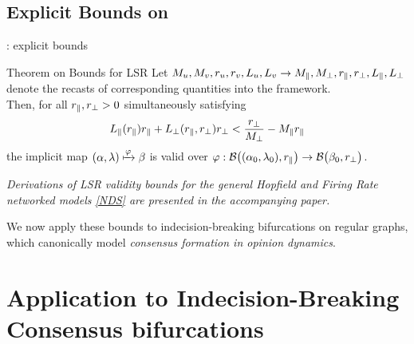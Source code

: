 \documentclass[11pt]{beamer}
\begin{document}
\subsection{Explicit Bounds on \LSR{}}

\begin{frame}{\LSR{}: explicit bounds}

    \setlength{\abovedisplayskip}{3pt}
    \setlength{\belowdisplayskip}{3pt}
    \setlength{\jot}{1pt}

    \begin{block}{Theorem on Bounds for LSR \cite{gupta2024estimates}}
        Let \(M_u, M_v, r_u, r_v, L_u, L_v \to M_{\parallel}, M_{\perp}, r_{\parallel}, r_{\perp}, L_{\parallel}, L_{\perp}\) denote the recasts of corresponding quantities into the \LSR{} framework. \\[3mm]
        Then, for all \(r_{\parallel},r_{\perp} > 0\) simultaneously satisfying
        \begin{equation*}
            L_{\parallel}(r_{\parallel}) r_{\parallel} + L_{\perp}(r_{\parallel},r_{\perp}) r_{\perp} < \frac{r_{\perp}}{M_{\perp}} - M_{\parallel} r_{\parallel}
        \end{equation*}
        the implicit map \((\alpha,\lambda)\xmapsto{\varphi}\beta\) is valid over \(\varphi:\mathcal{B}\big((\alpha_0,\lambda_0),r_{\parallel}\big)\to\mathcal{B}\big(\beta_0,r_{\perp}\big)\).
    \end{block}
    \begin{center}
        \vspace{4mm} \pause
        \emph{Derivations of LSR validity bounds for the general Hopfield and Firing Rate networked models \eqref{NDS} are presented in the accompanying paper.}

        \vspace{4mm} \pause
        We now apply these bounds to \alert{indecision-breaking bifurcations on regular graphs}, which canonically model \emph{consensus formation in opinion dynamics}.
    \end{center}

\end{frame}

\section{Application to Indecision-Breaking Consensus bifurcations}
\end{document}
